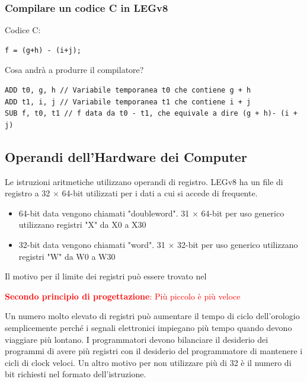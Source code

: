 \documentclass[12pt,a4paper]{article}
\begin{document}
\subsubsection{Compilare un codice C in LEGv8}
Codice C: 
\begin{center}
\begin{minipage}{.2\linewidth}
\begin{verbatim}
f = (g+h) - (i+j);
\end{verbatim}
\end{minipage}
\end{center}
Cosa andrà a produrre il compilatore?
\begin{verbatim}
ADD t0, g, h // Variabile temporanea t0 che contiene g + h
ADD t1, i, j // Variabile temporanea t1 che contiene i + j
SUB f, t0, t1 // f data da t0 - t1, che equivale a dire (g + h)- (i + j)
\end{verbatim}

\subsection{Operandi dell'Hardware dei Computer}
Le istruzioni aritmetiche utilizzano operandi di registro. LEGv8 ha un file di registro a 32 $\times$ 64-bit utilizzati per i dati a cui si accede di frequente.
\begin{itemize}
\item 64-bit data vengono chiamati "doubleword". 31 $\times$ 64-bit per uso generico utilizzano registri "X" da X0 a X30
\item 32-bit data vengono chiamati "word". 31 $\times$ 32-bit per uso generico utilizzano registri "W" da W0 a W30
\end{itemize}
Il motivo per il limite dei registri può essere trovato nel
\begin{center}\textcolor{red}{\textbf{Secondo principio di progettazione}: Più piccolo è più veloce}\end{center}
Un numero molto elevato di registri può aumentare il tempo di ciclo dell'orologio semplicemente perché i segnali elettronici impiegano più tempo quando devono viaggiare più lontano. I programmatori devono bilanciare il desiderio dei programmi di avere più registri con il desiderio del programmatore di mantenere i cicli di clock veloci. Un altro motivo per non utilizzare più di 32 è il numero di bit richiesti nel formato dell'istruzione.
\end{document}
